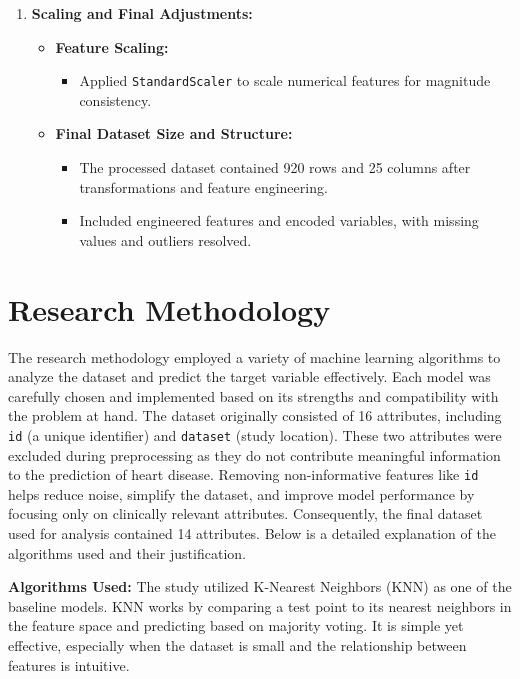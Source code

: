 \documentclass[pdflatex,sn-nature,Numbered]{sn-jnl}%
\theoremstyle{thmstyleone}%
\theoremstyle{thmstyletwo}%
\theoremstyle{thmstylethree}%
\begin{document}
\begin{enumerate}
    \item \textbf{Scaling and Final Adjustments:}
    \begin{itemize}
        \item \textbf{Feature Scaling:}
        \begin{itemize}
            \item Applied \texttt{StandardScaler} to scale numerical features for magnitude consistency.
        \end{itemize}
        \item \textbf{Final Dataset Size and Structure:}
        \begin{itemize}
            \item The processed dataset contained 920 rows and 25 columns after transformations and feature engineering.
            \item Included engineered features and encoded variables, with missing values and outliers resolved.
        \end{itemize}
    \end{itemize}
\end{enumerate}











\section{Research Methodology}
The research methodology employed a variety of machine learning algorithms to analyze the dataset and predict the target variable effectively. Each model was carefully chosen and implemented based on its strengths and compatibility with the problem at hand. The dataset \cite{dataset} originally consisted of 16 attributes, including \texttt{id} (a unique identifier) and \texttt{dataset} (study location). These two attributes were excluded during preprocessing as they do not contribute meaningful information to the prediction of heart disease. Removing non-informative features like \texttt{id} helps reduce noise, simplify the dataset, and improve model performance by focusing only on clinically relevant attributes. Consequently, the final dataset used for analysis contained 14 attributes.
 Below is a detailed explanation of the algorithms used and their justification.

\textbf{Algorithms Used:}
The study utilized K-Nearest Neighbors (KNN) as one of the baseline models. KNN works by comparing a test point to its nearest neighbors in the feature space and predicting based on majority voting. It is simple yet effective, especially when the dataset is small and the relationship between features is intuitive.
\end{document}
